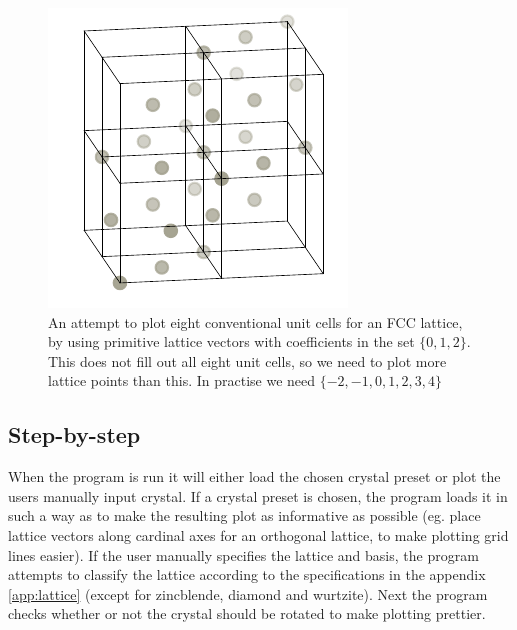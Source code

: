 \documentclass[main.tex]{subfiles}
\begin{document}
	\begin{figure}
		\begin{center}
			\includegraphics[width=\linewidth]{figures/lattice_unfinished_2.pdf}
		\end{center}
		\caption{An attempt to plot eight conventional unit cells for an FCC lattice, by using primitive lattice vectors with coefficients in the set $ \{0, 1, 2\} $. This does not fill out all eight unit cells, so we need to plot more lattice points than this. In practise we need $ \{-2, -1, 0, 1, 2, 3, 4\} $}
		\label{fig:lattice_unfinished_2}
	\end{figure}
	
	
	\subsection{Step-by-step}
	When the program is run it will either load the chosen crystal preset or plot the users manually input crystal. If a crystal preset is chosen, the program loads it in such a way as to make the resulting plot as informative as possible (eg. place lattice vectors along cardinal axes for an orthogonal lattice, to make plotting grid lines easier). If the user manually specifies the lattice and basis, the program attempts to classify the lattice according to the specifications in the appendix \ref{app:lattice} (except for zincblende, diamond and wurtzite). Next the program checks whether or not the crystal should be rotated to make plotting prettier.
	
\end{document}
